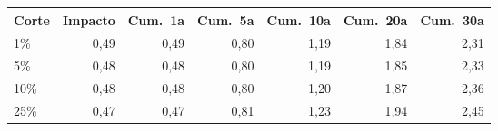 \begin{tabular}{lrrrrrr}
\toprule
Corte & Impacto & Cum.\ 1a & Cum.\ 5a & Cum.\ 10a & Cum.\ 20a & Cum.\ 30a \\
\midrule
1\% & 0,49 & 0,49 & 0,80 & 1,19 & 1,84 & 2,31 \\
5\% & 0,48 & 0,48 & 0,80 & 1,19 & 1,85 & 2,33 \\
10\% & 0,48 & 0,48 & 0,80 & 1,20 & 1,87 & 2,36 \\
25\% & 0,47 & 0,47 & 0,81 & 1,23 & 1,94 & 2,45 \\
\bottomrule
\end{tabular}
